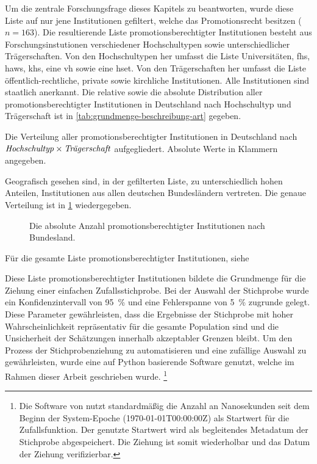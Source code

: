 Um die zentrale Forschungsfrage dieses Kapitels zu beantworten, wurde diese Liste auf nur jene Institutionen gefiltert, welche das Promotionsrecht besitzen ($n=163$).
Die resultierende Liste promotionsberechtigter Institutionen besteht aus Forschungsinstutionen verschiedener Hochschultypen sowie unterschiedlicher Trägerschaften.
Von den Hochschultypen her umfasst die Liste Universitäten, \glspl{fh}, \glspl{haw}, \glspl{kh}, eine \gls{vh} sowie eine \gls{hset}.
Von den Trägerschaften her umfasst die Liste öffentlich-rechtliche, private sowie kirchliche Institutionen. Alle Institutionen sind staatlich anerkannt.
Die relative sowie die absolute Distribution aller promotionsberechtigter Institutionen in Deutschland nach Hochschultyp und Trägerschaft ist in \cref{tab:grundmenge-beschreibung-art} gegeben.
\begin{table}[!htbp]
	\caption{Die Verteilung aller promotionsberechtigter Institutionen in Deutschland nach $\text{\textit{Hochschultyp}}\times\text{\textit{Trägerschaft}}$ aufgegliedert. Absolute Werte in Klammern angegeben.}
    
	\label{tab:grundmenge-beschreibung-art}
\end{table}

\noindent Geografisch gesehen sind, in der gefilterten Liste, zu unterschiedlich hohen Anteilen, Institutionen aus allen deutschen Bundesländern vertreten.
Die genaue Verteilung ist in \cref{fig:DE-grundmenge-beschreibung} wiedergegeben.
\begin{figure}[!htbp]
    \centering
    
    \caption{Die absolute Anzahl promotionsberechtigter Institutionen nach Bundesland.}
    \label{fig:DE-grundmenge-beschreibung}
\end{figure}

\noindent Für die gesamte Liste promotionsberechtigter Institutionen, siehe 

Diese Liste promotionsberechtigter Institutionen bildete die Grundmenge für die Ziehung einer einfachen Zufallsstichprobe.
Bei der Auswahl der Stichprobe wurde ein Konfidenzintervall von \SI{95}{\percent} und eine Fehlerspanne von \SI{5}{\percent} zugrunde gelegt.
Diese Parameter gewährleisten, dass die Ergebnisse der Stichprobe mit hoher Wahrscheinlichkeit repräsentativ für die gesamte Population sind und die Unsicherheit der Schätzungen innerhalb akzeptabler Grenzen bleibt.
Um den Prozess der Stichprobenziehung zu automatisieren und eine zufällige Auswahl zu gewährleisten, wurde eine auf Python basierende Software \autocite{Krassnig2024-csv} genutzt, welche im Rahmen dieser Arbeit geschrieben wurde.%
\footnote{%
Die Software von \citeauthor{Krassnig2024-csv} \autocite{Krassnig2024-csv} nutzt standardmäßig die Anzahl an Nanosekunden seit dem Beginn der System-Epoche (1970-01-01T00:00:00Z) als Startwert für die Zufallsfunktion.
Der genutzte Startwert wird als begleitendes Metadatum der Stichprobe abgespeichert.
Die Ziehung ist somit wiederholbar und das Datum der Ziehung verifizierbar.} 


